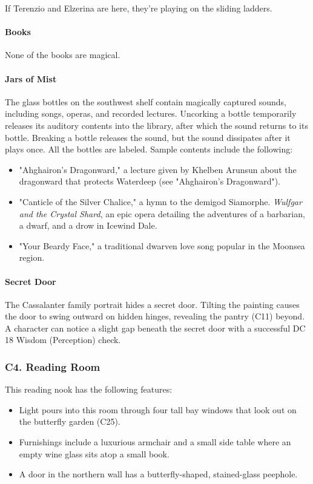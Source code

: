 \documentclass[10pt,a4paper,twoside,twocolumn,openany,nodeprecatedcode]{dndbook}
\begin{document}
If Terenzio and Elzerina are here, they're playing on the sliding ladders.
\paragraph{Books}
None of the books are magical.
\paragraph{Jars of Mist}
The glass bottles on the southwest shelf contain magically captured sounds, including songs, operas, and recorded lectures. Uncorking a bottle temporarily releases its auditory contents into the library, after which the sound returns to its bottle. Breaking a bottle releases the sound, but the sound dissipates after it plays once. All the bottles are labeled. Sample contents include the following:
\begin{itemize}

\item "Ahghairon's Dragonward," a lecture given by Khelben Arunsun about the dragonward that protects Waterdeep (see "Ahghairon's Dragonward").
\item "Canticle of the Silver Chalice," a hymn to the demigod Siamorphe. \textit{Wulfgar and the Crystal Shard}, an epic opera detailing the adventures of a barbarian, a dwarf, and a drow in Icewind Dale.
\item "Your Beardy Face," a traditional dwarven love song popular in the Moonsea region.
\end{itemize}


\paragraph{Secret Door}
The Cassalanter family portrait hides a secret door. Tilting the painting causes the door to swing outward on hidden hinges, revealing the pantry (C11) beyond. A character can notice a slight gap beneath the secret door with a successful DC 18 Wisdom (Perception) check.
\subsubsection{C4. Reading Room}
This reading nook has the following features:
\begin{itemize}

\item Light pours into this room through four tall bay windows that look out on the butterfly garden (C25).
\item Furnishings include a luxurious armchair and a small side table where an empty wine glass sits atop a small book.
\item A door in the northern wall has a butterfly-shaped, stained-glass peephole.
\end{itemize}
\end{document}

